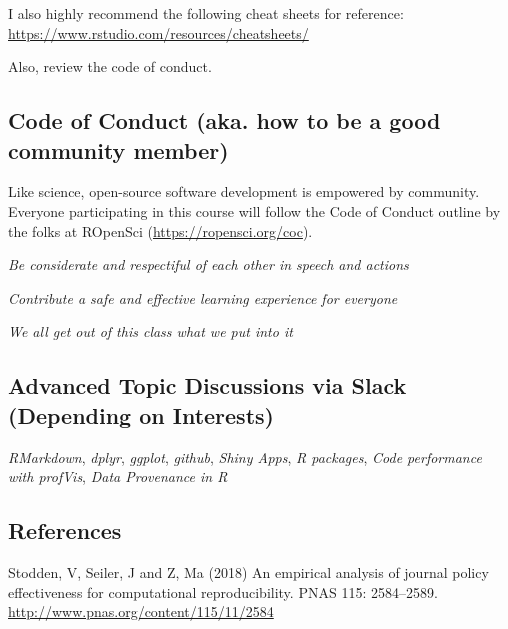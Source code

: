 \documentclass[11pt,]{article}
\begin{document}
I also highly recommend the following cheat sheets for reference:
\url{https://www.rstudio.com/resources/cheatsheets/}

Also, review the code of conduct.

\hypertarget{code-of-conduct-aka.-how-to-be-a-good-community-member}{%
\subsection{Code of Conduct (aka. how to be a good community
member)}\label{code-of-conduct-aka.-how-to-be-a-good-community-member}}

Like science, open-source software development is empowered by
community. Everyone participating in this course will follow the Code of
Conduct outline by the folks at ROpenSci
(\url{https://ropensci.org/coc}).

\emph{Be considerate and respectiful of each other in speech and
actions}

\emph{Contribute a safe and effective learning experience for everyone}

\emph{We all get out of this class what we put into it}

\hypertarget{advanced-topic-discussions-via-slack-depending-on-interests}{%
\subsection{Advanced Topic Discussions via Slack (Depending on
Interests)}\label{advanced-topic-discussions-via-slack-depending-on-interests}}

\emph{RMarkdown}, \emph{dplyr}, \emph{ggplot}, \emph{github},
\emph{Shiny Apps}, \emph{R packages}, \emph{Code performance with
profVis}, \emph{Data Provenance in R}

\hypertarget{references}{%
\subsection{References}\label{references}}

Stodden, V, Seiler, J and Z, Ma (2018) An empirical analysis of journal
policy effectiveness for computational reproducibility. PNAS 115:
2584--2589. \url{http://www.pnas.org/content/115/11/2584}
\end{document}
